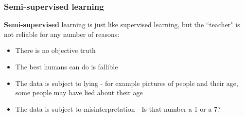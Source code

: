 \documentclass{article}
\begin{document}
\subsubsection{Semi-supervised learning}
\textbf{Semi-supervised} learning is just like supervised learning, but the ``teacher" is not reliable for any number of reasons:
\begin{itemize}
\item There is no objective truth
\item The best humans can do is fallible
\item The data is subject to lying - for example pictures of people and their age, some people may have lied about their age
\item The data is subject to misinterpretation - Is that number a 1 or a 7?
\end{itemize}
\end{document}
